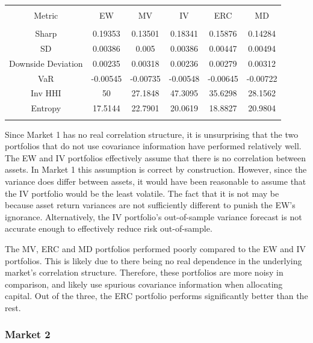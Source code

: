 \documentclass[11pt,preprint, authoryear]{elsarticle}
\let\origtable\table
\let\endorigtable\endtable
\renewenvironment{table}[1][2] {
    \expandafter\origtable\expandafter[H]
} {
    \endorigtable
}
\numberwithin{equation}{section}
\numberwithin{figure}{section}
\numberwithin{table}{section}
\begin{document}
\begin{table}[!htbp] \centering 
  \caption{Market 1 - Portfolio Risk Metrics} 
  \label{rm1} 
\begin{tabular}{@{\extracolsep{5pt}} cccccc} 
\\[-1.8ex]\hline 
\hline \\[-1.8ex] 
Metric & EW & MV & IV & ERC & MD \\ 
\hline \\[-1.8ex] 
Sharp & 0.19353 & 0.13501 & 0.18341 & 0.15876 & 0.14284 \\ 
SD & 0.00386 & 0.005 & 0.00386 & 0.00447 & 0.00494 \\ 
Downside Deviation & 0.00235 & 0.00318 & 0.00236 & 0.00279 & 0.00312 \\ 
VaR & -0.00545 & -0.00735 & -0.00548 & -0.00645 & -0.00722 \\ 
Inv HHI & 50 & 27.1848 & 47.3095 & 35.6298 & 28.1562 \\ 
Entropy & 17.5144 & 22.7901 & 20.0619 & 18.8827 & 20.9804 \\ 
\hline \\[-1.8ex] 
\end{tabular} 
\end{table}

Since Market 1 has no real correlation structure, it is unsurprising
that the two portfolios that do not use covariance information have
performed relatively well. The EW and IV portfolios effectively assume
that there is no correlation between assets. In Market 1 this assumption
is correct by construction. However, since the variance does differ
between assets, it would have been reasonable to assume that the IV
portfolio would be the least volatile. The fact that it is not may be
because asset return variances are not sufficiently different to punish
the EW's ignorance. Alternatively, the IV portfolio's out-of-sample
variance forecast is not accurate enough to effectively reduce risk
out-of-sample.

The MV, ERC and MD portfolios performed poorly compared to the EW and IV
portfolios. This is likely due to there being no real dependence in the
underlying market's correlation structure. Therefore, these portfolios
are more noisy in comparison, and likely use spurious covariance
information when allocating capital. Out of the three, the ERC portfolio
performs significantly better than the rest.

\hypertarget{market-2}{%
\subsubsection{Market 2}\label{market-2}}
\end{document}
